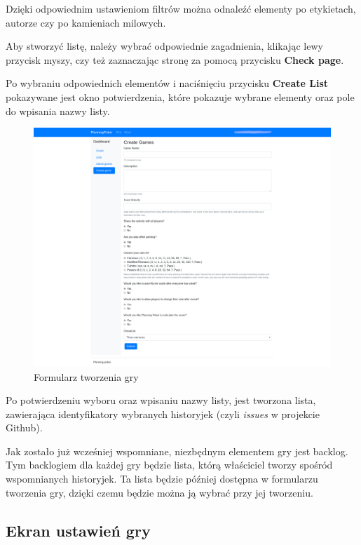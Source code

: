 Dzięki odpowiednim ustawieniom filtrów można odnaleźć elementy po etykietach,
autorze czy po kamieniach milowych.

Aby stworzyć listę, należy wybrać odpowiednie zagadnienia, klikając lewy przycisk myszy,
czy też zaznaczając stronę za pomocą przycisku \textbf{Check page}.

Po wybraniu odpowiednich elementów i naciśnięciu przycisku \textbf{Create List}
pokazywane jest okno potwierdzenia,
które pokazuje wybrane elementy oraz pole do wpisania nazwy listy.

\begin{figure}[H]
	\centering\includegraphics[width=\textwidth]{img/Formularz}
	\caption{Formularz tworzenia gry}\label{rys:form}%
\end{figure}

Po potwierdzeniu wyboru oraz wpisaniu nazwy listy, jest tworzona lista, zawierająca
identyfikatory wybranych historyjek (czyli \textit{issues} w projekcie Github).

Jak zostało już wcześniej wspomniane, niezbędnym elementem gry jest backlog.
Tym backlogiem dla każdej gry będzie lista, którą właściciel tworzy spośród wspomnianych historyjek.
Ta lista będzie później dostępna w formularzu tworzenia gry,
dzięki czemu będzie można ją wybrać przy jej tworzeniu.


\subsection{Ekran ustawień gry}

